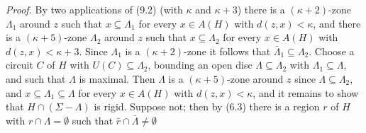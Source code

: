 \textit{Proof.} By two applications of (9.2) (with $\kappa$ and $\kappa + 3$) there is a $(\kappa + 2)$-zone $\Lambda_1$ around $z$ such that $x \subseteq \Lambda_1$ for every $x \in A(H)$ with $d(z, x) < \kappa$, and there is a $(\kappa + 5)$-zone $\Lambda_2$ around $z$ such that $x \subseteq \Lambda_2$ for every $x \in A(H)$ with $d(z, x) < \kappa + 3$. Since $\Lambda_1$ is a $(\kappa + 2)$-zone it follows that $\bar{\Lambda}_1 \subseteq \Lambda_2$. Choose a circuit $C$ of $H$ with $U(C) \subseteq \Lambda_2$, bounding an open disc $\Lambda \subseteq \Lambda_2$ with $\Lambda_1 \subseteq \Lambda$, and such that $\Lambda$ is maximal. Then $\Lambda$ is a $(\kappa + 5)$-zone around $z$ since $\Lambda \subseteq \Lambda_2$, and $x \subseteq \Lambda_1 \subseteq \Lambda$ for every $x \in A(H)$ with $d(z, x) < \kappa$, and it remains to show that $H \cap (\Sigma - \Lambda)$ is rigid. Suppose not; then by (6.3) there is a region $r$ of $H$ with $r \cap \Lambda = \emptyset$ such that $\bar{r} \cap \bar{\Lambda} \ne \emptyset$
